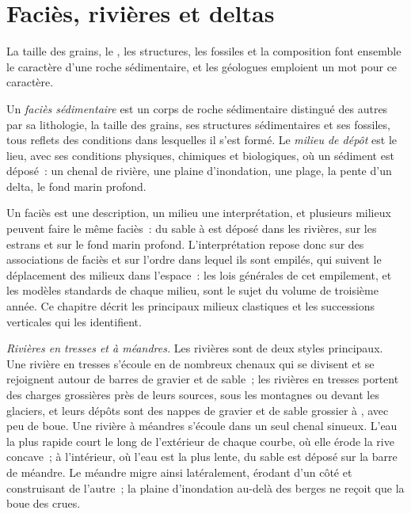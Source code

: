 \section{Faciès, rivières et deltas}\label{sec:b1:clastic-sediments:rivers-deltas}

La taille des grains, le , les structures, les fossiles et la composition font ensemble le
caractère d'une roche sédimentaire, et les géologues emploient un mot pour ce
caractère.

\begin{definition}\label{def:b1:clastic-sediments:facies}
Un \emph{faciès sédimentaire} est un corps de roche sédimentaire
distingué des autres par sa lithologie, la taille des grains, ses structures sédimentaires
et ses fossiles, tous reflets des conditions dans lesquelles il s'est
formé. Le \emph{milieu de dépôt} est
le lieu, avec ses conditions physiques, chimiques et biologiques, où un
sédiment est déposé~: un chenal de rivière, une plaine d'inondation, une plage, la pente d'un
delta, le fond marin profond.
\end{definition}

Un faciès est une description, un milieu une interprétation, et plusieurs
milieux peuvent faire le même faciès~: du sable à  est déposé dans les rivières, sur les
estrans et sur le fond marin profond. L'interprétation repose donc sur des
associations de faciès et sur l'ordre dans lequel ils sont empilés, qui suivent
le déplacement des milieux dans l'espace~: les lois générales de cet empilement,
et les modèles standards de chaque milieu, sont le sujet du volume de troisième année. Ce
chapitre décrit les principaux milieux clastiques et les successions verticales
qui les identifient.

\emph{Rivières en tresses et à méandres.} Les rivières sont de deux styles principaux. Une rivière
en tresses s'écoule en de nombreux chenaux qui se divisent et se rejoignent autour de barres de gravier et de
sable~; les rivières en tresses portent des charges grossières près de leurs sources, sous les montagnes ou
devant les glaciers, et leurs dépôts sont des nappes de gravier et de sable grossier
à , avec peu de boue. Une rivière à méandres s'écoule dans un seul chenal
sinueux. L'eau la plus rapide court le long de l'extérieur de chaque courbe, où
elle érode la rive concave~; à l'intérieur, où l'eau est la plus lente, du sable est déposé
sur la barre de méandre. Le méandre migre ainsi latéralement, érodant d'un côté
et construisant de l'autre~; la plaine d'inondation au-delà des berges ne reçoit que la
boue des crues.

